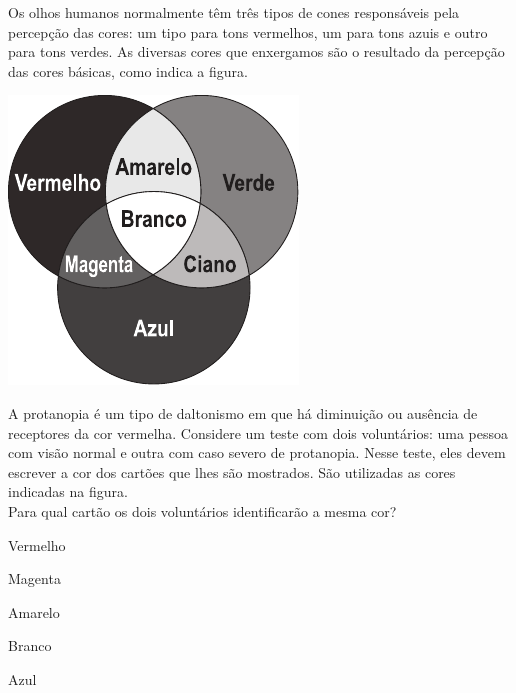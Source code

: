 \questao
Os olhos humanos normalmente têm três tipos de cones responsáveis pela percepção das cores: um tipo para tons vermelhos, um para tons azuis e outro para tons verdes. As diversas cores que enxergamos são o resultado da percepção das cores básicas, como indica a figura.
\begin{center}
\includegraphics[width=.7\columnwidth]{subareas/ciencias_natureza/fisica-1.pdf}
\end{center}
A protanopia é um tipo de daltonismo em que há diminuição ou ausência de receptores da cor vermelha. Considere um teste com dois voluntários: uma pessoa com visão normal e outra com caso severo de protanopia. Nesse teste, eles devem escrever a cor dos cartões que lhes são mostrados. São utilizadas as cores indicadas na figura.\\
Para qual cartão os dois voluntários identificarão a mesma cor?
\begin{alternativas}
\item Vermelho
\item Magenta
\item Amarelo
\item Branco
\item Azul
\end{alternativas}

